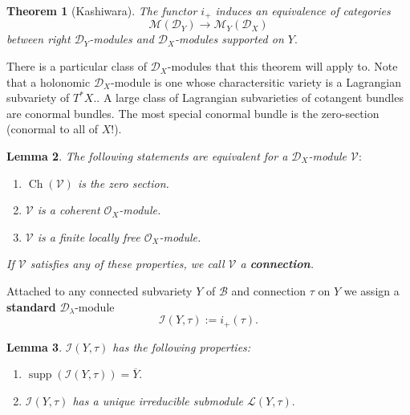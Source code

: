 \documentclass[letterpaper,twosided,11pt]{article}
\theoremstyle{plain}
\newtheorem{theorem}{Theorem}[section]
\newtheorem{lemma}[theorem]{Lemma}
\theoremstyle{definition}
\theoremstyle{remark}
\newcommand{\script}[1]{\mathscr{#1}}
\newcommand{\close}[1]{\overline{#1}}
\begin{document}
\begin{theorem}[Kashiwara]
    The functor $ i_+ $ induces an equivalence of categories
    \[
        \mathcal{M}(\mathcal{D}_Y)\to \mathcal{M}_Y(\mathcal{D}_X)
    \]
    between right $ \mathcal{D}_Y $-modules and $ \mathcal{D}_X $-modules
    supported on $ Y. $
\end{theorem}

There is a particular class of $ \mathcal{D}_X $-modules that this
theorem will apply to.  Note that a holonomic $ \mathcal{D}_X $-module
is one whose charactersitic variety is a Lagrangian subvariety of $ T^*X.
$.  A large class of Lagrangian subvarieties of cotangent bundles are
conormal bundles.  The most special conormal bundle is the zero-section
(conormal to all of $ X $!).

\begin{lemma}
    \cite[V.2]{MilicicDModules} The following statements are equivalent
    for a $ \mathcal{D}_X $-module $ \script{V}: $

    \begin{enumerate}
        \item
            $
            \operatorname{Ch}
            (\script{V}) $ is the zero section.
        \item
            $ \script{V} $ is a coherent $ \mathcal{O}_X $-module.
        \item
            $ \script{V} $ is a finite locally free $ \mathcal{O}_X $-module.
    \end{enumerate}
    If $ \script{V} $ satisfies any of these properties, we call $
    \script{V} $ a \textbf{connection}.
\end{lemma}

Attached to any connected subvariety $ Y $ of $ \mathcal{B} $ and
connection $ \tau $ on $ Y $ we assign a \textbf{standard} $ \mathcal{D}_\lambda
$-module
\[
    \mathcal{I}(Y,\tau):=i_+(\tau).
\]

\begin{lemma}
    $ \mathcal{I}(Y,\tau) $ has the following properties:
    \begin{enumerate}
        \item
            $
            \operatorname{supp}
            (\mathcal{I}(Y,\tau))=\close{Y}. $
        \item
            $ \mathcal{I}(Y,\tau) $ has a unique irreducible submodule $
            \mathcal{L}(Y,\tau). $
    \end{enumerate}
\end{lemma}
\end{document}
